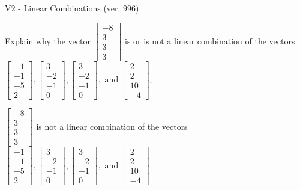 \begin{exercise}
  \begin{exerciseTitle}V2 - Linear Combinations (ver. 996)\end{exerciseTitle}
  \begin{exerciseStatement}
    Explain why the vector \(\left[\begin{array}{c}
-8 \\
3 \\
3 \\
3
\end{array}\right]\)  is or is not a linear 
	combination of the vectors \(\left[\begin{array}{c}
-1 \\
-1 \\
-5 \\
2
\end{array}\right] , \left[\begin{array}{c}
3 \\
-2 \\
-1 \\
0
\end{array}\right] , \left[\begin{array}{c}
3 \\
-2 \\
-1 \\
0
\end{array}\right] , \text{ and } \left[\begin{array}{c}
2 \\
2 \\
10 \\
-4
\end{array}\right]\).
	


  \end{exerciseStatement}
  \begin{exerciseAnswer}
   \(\left[\begin{array}{c}
-8 \\
3 \\
3 \\
3
\end{array}\right]\) 
  	 is not  
	a linear combination of the vectors \(\left[\begin{array}{c}
-1 \\
-1 \\
-5 \\
2
\end{array}\right] , \left[\begin{array}{c}
3 \\
-2 \\
-1 \\
0
\end{array}\right] , \left[\begin{array}{c}
3 \\
-2 \\
-1 \\
0
\end{array}\right] , \text{ and } \left[\begin{array}{c}
2 \\
2 \\
10 \\
-4
\end{array}\right]\).


\end{exerciseAnswer}
\end{exercise}
